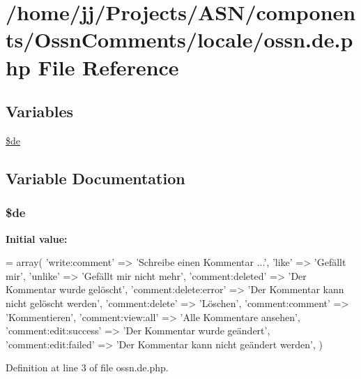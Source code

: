 \hypertarget{components_2_ossn_comments_2locale_2ossn_8de_8php}{}\section{/home/jj/\+Projects/\+A\+S\+N/components/\+Ossn\+Comments/locale/ossn.de.\+php File Reference}
\label{components_2_ossn_comments_2locale_2ossn_8de_8php}
\subsection*{Variables}
\begin{DoxyCompactItemize}
\item 
\hyperlink{components_2_ossn_comments_2locale_2ossn_8de_8php_aab7de7e51b4580005f63dd4cf5e17311}{\$de}
\end{DoxyCompactItemize}


\subsection{Variable Documentation}
\subsubsection[{\texorpdfstring{\$de}{$de}}]{\setlength{\rightskip}{0pt plus 5cm}\$de}\hypertarget{components_2_ossn_comments_2locale_2ossn_8de_8php_aab7de7e51b4580005f63dd4cf5e17311}{}\label{components_2_ossn_comments_2locale_2ossn_8de_8php_aab7de7e51b4580005f63dd4cf5e17311}
{\bfseries Initial value\+:}
\begin{DoxyCode}
= array(
        \textcolor{stringliteral}{'write:comment'} => \textcolor{stringliteral}{'Schreibe einen Kommentar ...'},
        \textcolor{stringliteral}{'like'} => \textcolor{stringliteral}{'Gefällt mir'},
        \textcolor{stringliteral}{'unlike'} => \textcolor{stringliteral}{'Gefällt mir nicht mehr'},
        \textcolor{stringliteral}{'comment:deleted'} => \textcolor{stringliteral}{'Der Kommentar wurde gelöscht'},
        \textcolor{stringliteral}{'comment:delete:error'} => \textcolor{stringliteral}{'Der Kommentar kann nicht gelöscht werden'},
        \textcolor{stringliteral}{'comment:delete'} => \textcolor{stringliteral}{'Löschen'},
        \textcolor{stringliteral}{'comment:comment'} => \textcolor{stringliteral}{'Kommentieren'},
        \textcolor{stringliteral}{'comment:view:all'} => \textcolor{stringliteral}{'Alle Kommentare ansehen'},
        \textcolor{stringliteral}{'comment:edit:success'} => \textcolor{stringliteral}{'Der Kommentar wurde geändert'},
        \textcolor{stringliteral}{'comment:edit:failed'} => \textcolor{stringliteral}{'Der Kommentar kann nicht geändert werden'},
)
\end{DoxyCode}


Definition at line 3 of file ossn.\+de.\+php.

